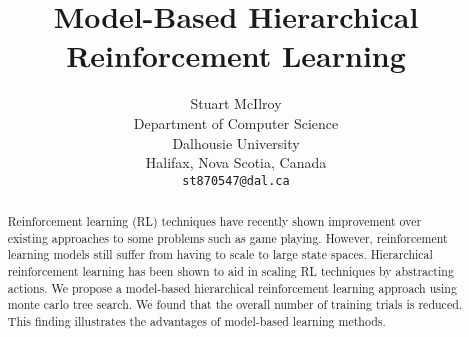 \documentclass{article} %
\title{Model-Based Hierarchical Reinforcement Learning}
\author{
Stuart McIlroy \\
Department of Computer Science\\
Dalhousie University\\
Halifax, Nova Scotia, Canada \\
\texttt{st870547@dal.ca} \\
}
\begin{document}
\graphicspath{{figures/}}
\maketitle

\begin{abstract}
Reinforcement learning (RL) techniques have recently shown improvement over existing approaches to some problems such as game playing. However, reinforcement learning models still suffer from having to scale to large state spaces. Hierarchical reinforcement learning has been shown to aid in scaling RL techniques by abstracting actions. We propose a model-based hierarchical reinforcement learning approach using monte carlo tree search. We found that the overall number of training trials is reduced. This finding illustrates the advantages of model-based learning methods.
\end{abstract}











{}

\end{document}
